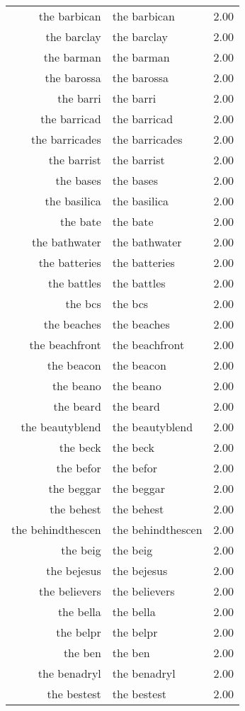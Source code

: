 \begin{table}[ht]
\begin{tabular}{rlr}
  the barbican & the barbican & 2.00 \\ 
  the barclay & the barclay & 2.00 \\ 
  the barman & the barman & 2.00 \\ 
  the barossa & the barossa & 2.00 \\ 
  the barri & the barri & 2.00 \\ 
  the barricad & the barricad & 2.00 \\ 
  the barricades & the barricades & 2.00 \\ 
  the barrist & the barrist & 2.00 \\ 
  the bases & the bases & 2.00 \\ 
  the basilica & the basilica & 2.00 \\ 
  the bate & the bate & 2.00 \\ 
  the bathwater & the bathwater & 2.00 \\ 
  the batteries & the batteries & 2.00 \\ 
  the battles & the battles & 2.00 \\ 
  the bcs & the bcs & 2.00 \\ 
  the beaches & the beaches & 2.00 \\ 
  the beachfront & the beachfront & 2.00 \\ 
  the beacon & the beacon & 2.00 \\ 
  the beano & the beano & 2.00 \\ 
  the beard & the beard & 2.00 \\ 
  the beautyblend & the beautyblend & 2.00 \\ 
  the beck & the beck & 2.00 \\ 
  the befor & the befor & 2.00 \\ 
  the beggar & the beggar & 2.00 \\ 
  the behest & the behest & 2.00 \\ 
  the behindthescen & the behindthescen & 2.00 \\ 
  the beig & the beig & 2.00 \\ 
  the bejesus & the bejesus & 2.00 \\ 
  the believers & the believers & 2.00 \\ 
  the bella & the bella & 2.00 \\ 
  the belpr & the belpr & 2.00 \\ 
  the ben & the ben & 2.00 \\ 
  the benadryl & the benadryl & 2.00 \\ 
  the bestest & the bestest & 2.00 \\ 

\end{tabular}
\end{table}
